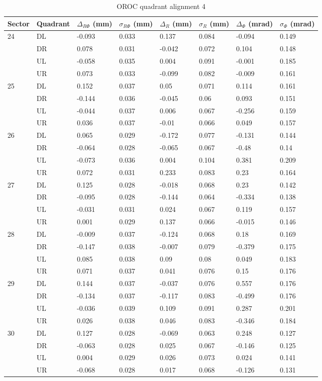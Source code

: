 \begin{table}
\caption{OROC quadrant alignment 4}
\begin{tabular}{|l|l|l|l|l|l|l|l|} \hline
Sector & Quadrant & $\Delta_{R\Phi}$ (mm)& $\sigma_{R\Phi}$ (mm) &
 $\Delta_{R}$ (mm)& $\sigma_{R}$ (mm) & $\Delta_{\Phi}$ (mrad)& $\sigma_{\Phi}$ (mrad)\\ \hline
24&DL&-0.093&0.033&0.137&0.084&-0.094&0.149\\ \hline
&DR&0.078&0.031&-0.042&0.072&0.104&0.148\\ \hline
&UL&-0.058&0.035&0.004&0.091&-0.001&0.185\\ \hline
&UR&0.073&0.033&-0.099&0.082&-0.009&0.161\\ \hline
25&DL&0.152&0.037&0.05&0.071&0.114&0.161\\ \hline
&DR&-0.144&0.036&-0.045&0.06&0.093&0.151\\ \hline
&UL&-0.044&0.037&0.006&0.067&-0.256&0.159\\ \hline
&UR&0.036&0.037&-0.01&0.066&0.049&0.157\\ \hline
26&DL&0.065&0.029&-0.172&0.077&-0.131&0.144\\ \hline
&DR&-0.064&0.028&-0.065&0.067&-0.48&0.14\\ \hline
&UL&-0.073&0.036&0.004&0.104&0.381&0.209\\ \hline
&UR&0.072&0.031&0.233&0.083&0.23&0.164\\ \hline
27&DL&0.125&0.028&-0.018&0.068&0.23&0.142\\ \hline
&DR&-0.095&0.028&-0.144&0.064&-0.334&0.138\\ \hline
&UL&-0.031&0.031&0.024&0.067&0.119&0.157\\ \hline
&UR&0.001&0.029&0.137&0.066&-0.015&0.146\\ \hline
28&DL&-0.009&0.037&-0.124&0.068&0.18&0.169\\ \hline
&DR&-0.147&0.038&-0.007&0.079&-0.379&0.175\\ \hline
&UL&0.085&0.038&0.09&0.08&0.049&0.183\\ \hline
&UR&0.071&0.037&0.041&0.076&0.15&0.176\\ \hline
29&DL&0.144&0.037&-0.037&0.076&0.557&0.176\\ \hline
&DR&-0.134&0.037&-0.117&0.083&-0.499&0.176\\ \hline
&UL&-0.036&0.039&0.109&0.091&0.287&0.201\\ \hline
&UR&0.026&0.038&0.046&0.083&-0.346&0.184\\ \hline
30&DL&0.127&0.028&-0.069&0.063&0.248&0.127\\ \hline
&DR&-0.063&0.028&0.025&0.067&-0.146&0.125\\ \hline
&UL&0.004&0.029&0.026&0.073&0.024&0.141\\ \hline
&UR&-0.068&0.028&0.017&0.068&-0.126&0.131\\ \hline
\end{tabular}
\label{table:QudrantAlignement}
\end{table}
